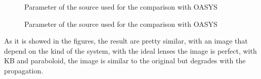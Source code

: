 \begin{figure}[]
%
\centering
%
%
%
\caption{Parameter of the source used for the comparison with OASYS}
%
\label{fig: paraboloid OASYS}
%
\end{figure}
%
\begin{figure}[]
%
%
%
\caption{Parameter of the source used for the comparison with OASYS}
%
\label{fig: KB system OASYS}
%
\end{figure}
 As it is showed in the figures, the result are pretty similar, with an image that depend on the kind of the system, with the ideal lenses the image is perfect, with KB and paraboloid, the image is similar to the original but degrades with the propagation.
%
\newpage
%

